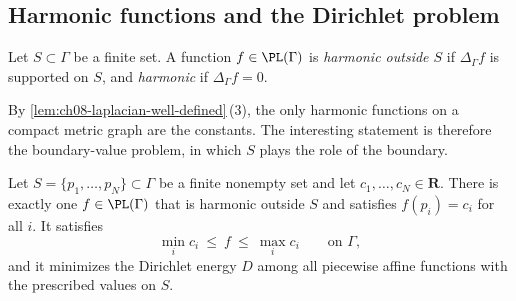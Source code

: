 \subsection{Harmonic functions and the Dirichlet problem}
\label{sec:ch08-harmonic}

\begin{definition}
\label{def:ch08-graph-harmonic}
Let $S\subset\Gamma$ be a finite set.  A function $f\in\PL(\Gamma)$ is
\emph{harmonic outside $S$} if $\Delta_\Gamma f$ is supported on $S$, and
\emph{harmonic} if $\Delta_\Gamma f=0$.
\end{definition}

By \cref{lem:ch08-laplacian-well-defined}\,(3), the only harmonic functions on
a compact metric graph are the constants.  The interesting statement is
therefore the boundary-value problem, in which $S$ plays the role of the
boundary.

\begin{proposition}
\label{prop:ch08-dirichlet}
Let $S=\{p_1,\ldots,p_N\}\subset\Gamma$ be a finite nonempty set and let
$c_1,\ldots,c_N\in\mathbf R$.  There is exactly one $f\in\PL(\Gamma)$ that is
harmonic outside $S$ and satisfies $f(p_i)=c_i$ for all $i$.  It satisfies
\[
   \min_i c_i\ \leq\ f\ \leq\ \max_i c_i \qquad\text{on }\Gamma,
\]
and it minimizes the Dirichlet energy $D$ among all piecewise affine
functions with the prescribed values on $S$.
\end{proposition}

